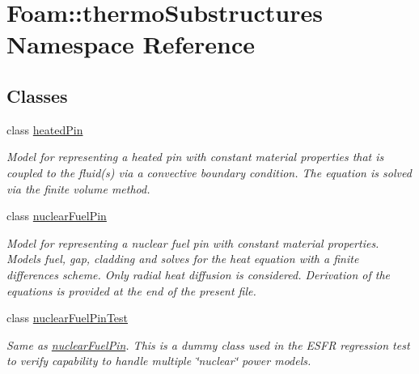\hypertarget{namespaceFoam_1_1thermoSubstructures}{}\section{Foam\+:\+:thermo\+Substructures Namespace Reference}
\label{namespaceFoam_1_1thermoSubstructures}
\subsection*{Classes}
\begin{DoxyCompactItemize}
\item 
class \hyperlink{classFoam_1_1thermoSubstructures_1_1heatedPin}{heated\+Pin}
\begin{DoxyCompactList}\small\item\em Model for representing a heated pin with constant material properties that is coupled to the fluid(s) via a convective boundary condition. The equation is solved via the finite volume method. \end{DoxyCompactList}\item 
class \hyperlink{classFoam_1_1thermoSubstructures_1_1nuclearFuelPin}{nuclear\+Fuel\+Pin}
\begin{DoxyCompactList}\small\item\em Model for representing a nuclear fuel pin with constant material properties. Models fuel, gap, cladding and solves for the heat equation with a finite differences scheme. Only radial heat diffusion is considered. Derivation of the equations is provided at the end of the present file. \end{DoxyCompactList}\item 
class \hyperlink{classFoam_1_1thermoSubstructures_1_1nuclearFuelPinTest}{nuclear\+Fuel\+Pin\+Test}
\begin{DoxyCompactList}\small\item\em Same as \hyperlink{classFoam_1_1thermoSubstructures_1_1nuclearFuelPin}{nuclear\+Fuel\+Pin}. This is a dummy class used in the E\+S\+FR regression test to verify capability to handle multiple \char`\"{}nuclear\char`\"{} power models. \end{DoxyCompactList}\end{DoxyCompactItemize}
